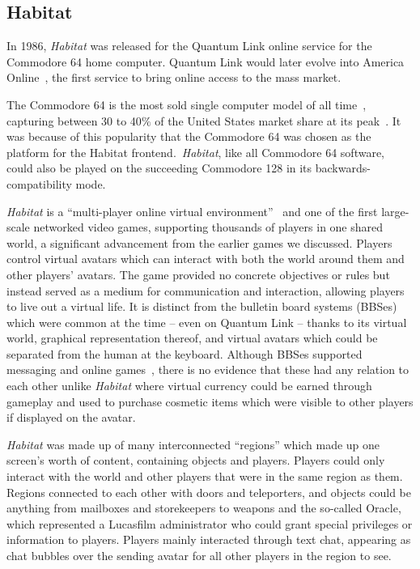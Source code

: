 \subsection{Habitat}\label{subsec:habitat}

In 1986, \textit{Habitat} was released for the Quantum Link online service for the Commodore 64 home computer. Quantum Link would later evolve into America Online~\cite{nollinger}, the first service to bring online access to the mass market.

The Commodore 64 is the most sold single computer model of all time~\cite{guinnessc64}, capturing between 30 to 40$\%$ of the United States market share at its peak~\cite{marketshare}. It was because of this popularity that the Commodore 64 was chosen as the platform for the Habitat frontend.\ \textit{Habitat}, like all Commodore 64 software, could also be played on the succeeding Commodore 128 in its backwards-compatibility mode.

\textit{Habitat} is a ``multi-player online virtual environment''~\cite{morningstar} and one of the first large-scale networked video games, supporting thousands of players in one shared world, a significant advancement from the earlier games we discussed. Players control virtual avatars which can interact with both the world around them and other players' avatars. The game provided no concrete objectives or rules but instead served as a medium for communication and interaction, allowing players to live out a virtual life. It is distinct from the bulletin board systems (BBSes) which were common at the time -- even on Quantum Link -- thanks to its virtual world, graphical representation thereof, and virtual avatars which could be separated from the human at the keyboard. Although BBSes supported messaging and online games~\cite{pcmagbbs}, there is no evidence that these had any relation to each other unlike \textit{Habitat} where virtual currency could be earned through gameplay and used to purchase cosmetic items which were visible to other players if displayed on the avatar.

\textit{Habitat} was made up of many interconnected ``regions'' which made up one screen's worth of content, containing objects and players. Players could only interact with the world and other players that were in the same region as them. Regions connected to each other with doors and teleporters, and objects could be anything from mailboxes and storekeepers to weapons and the so-called Oracle, which represented a Lucasfilm administrator who could grant special privileges or information to players. Players mainly interacted through text chat, appearing as chat bubbles over the sending avatar for all other players in the region to see.


